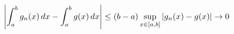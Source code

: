 \documentclass[preview]{standalone}
\begin{document}
\begin{align*}
\special{dvisvgm:raw <g id='unique000'>}\left|\int_a^b g_n(x)\,dx-\int_a^b g(x)\,dx\right|\le(b-a)\sup_{x\in[a,b]}|g_n(x)-g(x)|\to0\special{dvisvgm:raw </g>}
\end{align*}
\end{document}
